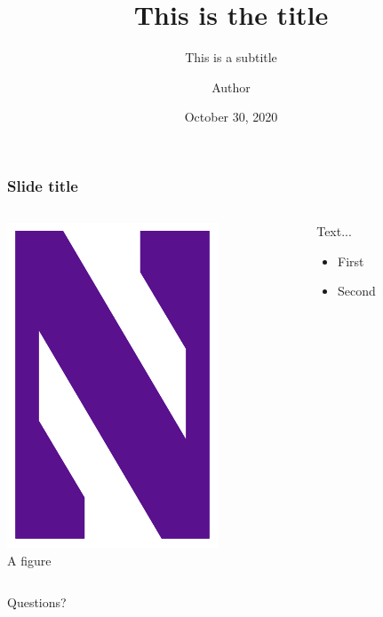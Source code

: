 \documentclass[xcolor=dvipsnames,aspectratio=169]{beamer}
\begin{document}
\title[Title]{This is the title}
\subtitle{This is a subtitle\\[1em]}
\author[AUTHOR]{Author}
\date {October 30, 2020}

\begin{frame}[plain]
  \titlepage
\end{frame}


\begin{frame}
  \frametitle{Slide title}
  \begin{columns}
    \begin{column}{0.4\textwidth}
      \begin{center}
        \includegraphics[width=.5\textwidth]{Northwestern_Wildcats_logo}\\
        A figure
      \end{center}
    \end{column}
    \begin{column}{0.65\textwidth}
      Text...
      \begin{itemize}
      \item First
      \item Second
      \end{itemize}
    \end{column}
  \end{columns}
\end{frame}



\begin{frame}
  \vspace{1cm}
  \begin{center}
    \Huge{{\color{northwestern purple}Questions?}}
  \end{center}
\end{frame}
\end{document}
